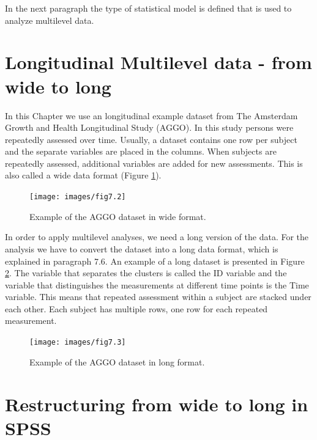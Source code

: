 \documentclass[
]{book}
\begin{document}
In the next paragraph the type of statistical model is defined that is used to analyze multilevel data.

\hypertarget{longitudinal-multilevel-data---from-wide-to-long}{%
\section{Longitudinal Multilevel data - from wide to long}\label{longitudinal-multilevel-data---from-wide-to-long}}

In this Chapter we use an longitudinal example dataset from The Amsterdam Growth and Health Longitudinal Study (AGGO). In this study persons were repeatedly assessed over time. Usually, a dataset contains one row per subject and the separate variables are placed in the columns. When subjects are repeatedly assessed, additional variables are added for new assessments. This is also called a wide data format (Figure \ref{fig:fig74}).

\begin{figure}

{\centering \texttt{[image: images/fig7.2]} 

}

\caption{Example of the AGGO dataset in wide format.}\label{fig:fig74}
\end{figure}

In order to apply multilevel analyses, we need a long version of the data. For the analysis we have to convert the dataset into a long data format, which is explained in paragraph 7.6. An example of a long dataset is presented in Figure \ref{fig:fig75}. The variable that separates the clusters is called the ID variable and the variable that distinguishes the measurements at different time points is the Time variable. This means that repeated assessment within a subject are stacked under each other. Each subject has multiple rows, one row for each repeated measurement.

\begin{figure}

{\centering \texttt{[image: images/fig7.3]} 

}

\caption{Example of the AGGO dataset in long format.}\label{fig:fig75}
\end{figure}

\hypertarget{restructuring-from-wide-to-long-in-spss}{%
\section{Restructuring from wide to long in SPSS}\label{restructuring-from-wide-to-long-in-spss}}
\end{document}

